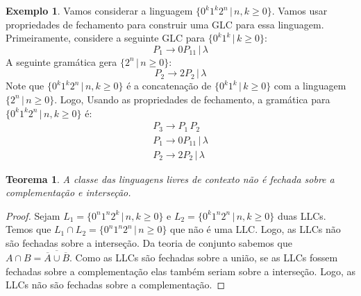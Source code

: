\documentclass[a4paper]{article}
\newtheorem{Theorem}{Teorema}
\theoremstyle{definition}
\newtheorem{Example}{Exemplo}
\begin{document}
  \begin{Example}
    Vamos considerar a linguagem $\{0^k1^k2^n\,|\,n,k\geq 0\}$. Vamos usar
    propriedades de fechamento para construir uma GLC para essa linguagem.
    Primeiramente, considere a seguinte GLC para $\{0^k1^k\,|\,k\geq 0\}$:
    \[
      P_1 \to 0P_11 \,|\, \lambda
    \]
    A seguinte gramática gera $\{2^n\,|\, n \geq 0\}$:
    \[
      P_2 \to 2P_2 \,|\, \lambda
    \]
    Note que $\{0^k1^k2^n\,|\,n,k\geq 0\}$ é a concatenação de
    $\{0^k1^k\,|\,k\geq 0\}$ com a linguagem $\{2^n\,|\, n \geq 0\}$. Logo,
    Usando as propriedades de fechamento, a gramática para
    $\{0^k1^k2^n\,|\,n,k\geq 0\}$ é:
    \[
      \begin{array}{l}
        P_3 \to P_1\,P_2\\
        P_1 \to 0P_11 \,|\, \lambda\\
        P_2 \to 2P_2 \,|\, \lambda
      \end{array}
    \]
  \end{Example}

  \begin{Theorem}
    A classe das linguagens livres de contexto não é fechada sobre a
    complementação e interseção.
  \end{Theorem}
  \begin{proof}
    Sejam $L_1 = \{0^n1^n2^k\,|\,n,k\geq 0\}$ e $L_2 = \{0^k1^n2^n\,|\,n,k\geq
    0\}$ duas LLCs. Temos que $L_1 \cap L_2 = \{0^n1^n2^n\,|\,n\geq 0\}$ que não
    é uma LLC. Logo, as LLCs não são fechadas sobre a interseção. Da teoria de
    conjunto sabemos que $A \cap B = \overline{\overline{A} \cup \overline{B}}$.
    Como as LLCs são fechadas sobre a união, se as LLCs fossem fechadas sobre a
    complementação elas também seriam sobre a interseção. Logo, as LLCs não são
    fechadas sobre a complementação.
  \end{proof}
\end{document}
